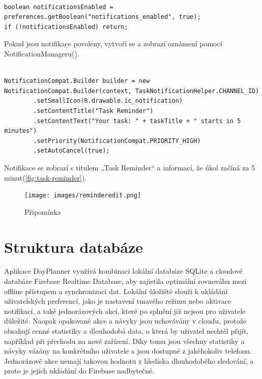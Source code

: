 \begin{lstlisting}[style=javastyle,caption = {Povolení notifikací},label = {lst:notificationsEnabled}]

boolean notificationsEnabled = preferences.getBoolean("notifications_enabled", true);
if (!notificationsEnabled) return;

\end{lstlisting}


Pokud jsou notifikace povoleny, vytvoří se a zobrazí oznámení pomocí NotificationManageru().

\begin{lstlisting}[style=javastyle,caption = {Vytvoření notifikace},label = {lst:NotifikaceDesign}]

NotificationCompat.Builder builder = new NotificationCompat.Builder(context, TaskNotificationHelper.CHANNEL_ID)
        .setSmallIcon(R.drawable.ic_notification)
        .setContentTitle("Task Reminder")
        .setContentText("Your task: " + taskTitle + " starts in 5 minutes")
        .setPriority(NotificationCompat.PRIORITY_HIGH)
        .setAutoCancel(true);

\end{lstlisting}


Notifikace se zobrazí s titulem „Task Reminder“ a informací, že úkol začíná za 5 minut(\autoref{fig:task-reminder}).

\begin{figure}[H]
    \centering
    \texttt{[image: images/reminderedit.png]}
    \caption{Připomínka}
    \label{fig:task-reminder}
\end{figure}

\newpage

\section{Struktura databáze}
\hspace{14pt} Aplikace DayPlanner využívá kombinaci lokální databáze SQLite a cloudové databáze Firebase Realtime Database, aby zajistila optimální rovnováhu mezi offline přístupem a synchronizací dat. Lokální úložiště slouží k ukládání uživatelských preferencí, jako je nastavení tmavého režimu nebo aktivace notifikací, a také jednorázových akcí, které po splnění již nejsou pro uživatele důležité. Naopak opakované akce a návyky jsou uchovávány v cloudu, protože obsahují cenné statistiky a dlouhodobá data, o která by uživatel nechtěl přijít, například při přechodu na nové zařízení. Díky tomu jsou všechny statistiky a návyky vázány na konkrétního uživatele a jsou dostupné z jakéhokoliv telefonu. Jednorázové akce nemají takovou hodnotu z hlediska dlouhodobého sledování, a proto je jejich ukládání do Firebase nadbytečné.

